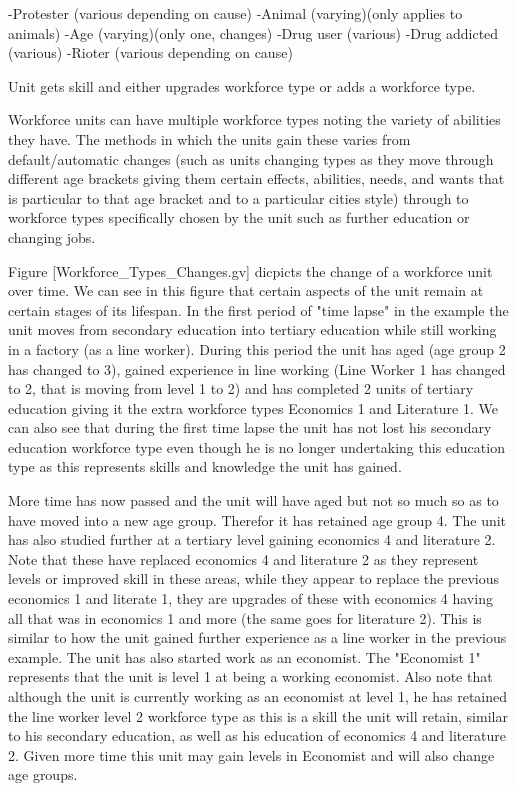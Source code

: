 -Protester (various depending on cause)
-Animal (varying)(only applies to animals)
-Age (varying)(only one, changes)
-Drug user (various)
-Drug addicted (various)
-Rioter (various depending on cause)




Unit gets skill and either upgrades workforce type or adds a workforce type.

Workforce units can have multiple workforce types noting the variety of abilities they have. The methods in which the units gain these varies from default/automatic changes (such as units changing types as they move through different age brackets giving them certain effects, abilities, needs, and wants that is particular to that age bracket and to a particular cities style) through to workforce types specifically chosen by the unit such as further education or changing jobs. 

Figure [Workforce_Types_Changes.gv] dicpicts the change of a workforce unit over time. We can see in this figure that certain aspects of the unit remain at certain stages of its lifespan. In the first period of "time lapse" in the example the unit moves from secondary education into tertiary education while still working in a factory (as a line worker). During this period the unit has aged (age group 2 has changed to 3), gained experience in line working (Line Worker 1 has changed to 2, that is moving from level 1 to 2) and has completed 2 units of tertiary education giving it the extra workforce types Economics 1 and Literature 1. We can also see that during the first time lapse the unit has not lost his secondary education workforce type even though he is no longer undertaking this education type as this represents skills and knowledge the unit has gained. 

More time has now passed and the unit will have aged but not so much so as to have moved into a new age group. Therefor it has retained age group 4. The unit has also studied further at a tertiary level gaining economics 4 and literature 2. Note that these have replaced economics 4 and literature 2 as they represent levels or improved skill in these areas, while they appear to replace the previous economics 1 and literate 1, they are upgrades of these with economics 4 having all that was in economics 1 and more (the same goes for literature 2). This is similar to how the unit gained further experience as a line worker in the previous example. The unit has also started work as an economist. The "Economist 1" represents that the unit is level 1 at being a working economist. Also note that although the unit is currently working as an economist at level 1, he has retained the line worker level 2 workforce type as this is a skill the unit will retain, similar to his secondary education, as well as his education of economics 4 and literature 2. Given more time this unit may gain levels in Economist and will also change age groups. 

